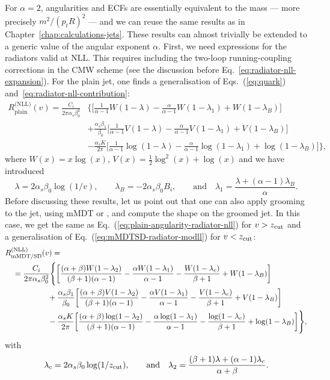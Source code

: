 For $\alpha=2$, angularities and ECFs are essentially equivalent to
the mass --- more precisely $m^2/(p_tR)^2$ --- and we can reuse the
same results as in Chapter~\ref{chap:calculations-jets}. 
%
These results can almost trivially be extended to a generic value of
the angular exponent $\alpha$. First, we need expressions for the
radiators valid at NLL. This requires including the two-loop
running-coupling corrections in the CMW scheme (see the discussion
before Eq.~\eqref{eq:radiator-nll-expansion}).
%
For the plain jet, one finds a generalisation of Eqs.~(\ref{eq:quark})
and~\eqref{eq:radiator-nll-contribution}:
\begin{align}\label{eq:plain-angularity-radiator-nll}
  R_\text{plain}^{\text{(NLL)}}(v)
   = \frac{C_i}{2\pi\alpha_s\beta_0^2}&\Bigg\{
    \bigg[\frac{1}{\alpha-1}W(1-\lambda)-\frac{\alpha}{\alpha-1}W(1-\lambda_1)+W(1-\lambda_B)\bigg]\\
  & +\frac{\alpha_s\beta_1}{\beta_0}\bigg[
\frac{1}{\alpha-1}V(1-\lambda)-\frac{\alpha}{\alpha-1}V(1-\lambda_1)+V(1-\lambda_B)
    \bigg]\nonumber\\
    & -\frac{\alpha_sK}{2\pi}\bigg[
\frac{1}{\alpha-1}\log(1-\lambda)-\frac{\alpha}{\alpha-1}\log(1-\lambda_1)+\log(1-\lambda_B)
    \bigg]\Bigg\},\nonumber
\end{align}
where $W(x)=x\log(x)$, $V(x)=\tfrac{1}{2}\log^2(x)+\log(x)$ and we have introduced 
\begin{equation}
  \lambda = 2\alpha_s\beta_0\log(1/v),\qquad
  \lambda_B = -2\alpha_s\beta_0 B_i,\qquad\text{and}\quad
  \lambda_1  = \frac{\lambda+(\alpha-1)\lambda_B}{\alpha}.
\end{equation}
Before discussing these results, let us point out that one can also
apply grooming to the jet, using mMDT or \SD, and compute the shape on
the groomed jet. In this case, we get the same as 
Eq.~(\ref{eq:plain-angularity-radiator-nll}) for $v>z_{\text{cut}}$ and a generalisation of
Eq.~(\ref{eq:mMDTSD-radiator-modll}) for $v< z_{\text{cut}}$:
\begin{align}\label{eq:sd-angularity-radiator-nll}
  \MoveEqLeft[1] R_\text{mMDT/SD}^{\text{(NLL)}}(v) = \\
  & = \frac{C_i}{2\pi\alpha_s\beta_0^2}\Bigg\{
    \bigg[\frac{(\alpha+\beta)W(1-\lambda_2)}{(\beta+1)(\alpha-1)}-\frac{\alpha
    W(1-\lambda_1)}{\alpha-1}-\frac{W(1-\lambda_c)}{\beta+1}+W(1-\lambda_B)\bigg]\nonumber\\
  & \phantom{=\frac{C_i}{2\pi\alpha_s\beta_0^2}}
    +\frac{\alpha_s\beta_1}{\beta_0}\bigg[
\frac{(\alpha+\beta)V(1-\lambda_2)}{(\beta+1)(\alpha-1)}-\frac{\alpha
    V(1-\lambda_1)}{\alpha-1}-\frac{V(1-\lambda_c)}{\beta+1}+V(1-\lambda_B)    \bigg]\nonumber\\
  & \phantom{=\frac{C_i}{2\pi\alpha_s\beta_0^2}}
    -\frac{\alpha_sK}{2\pi}\bigg[
\frac{(\alpha+\beta)\log(1-\lambda_2)}{(\beta+1)(\alpha-1)}-\frac{\alpha
    \log(1-\lambda_1)}{\alpha-1}-\frac{\log(1-\lambda_c)}{\beta+1}+\log(1-\lambda_B) \bigg]\Bigg\},\nonumber
\end{align}
with 
\begin{equation}
 \lambda_c = 2\alpha_s\beta_0\log(1/z_{\text{cut}}),
 \qquad\text{and}\quad
 \lambda_2 = \frac{(\beta+1)\lambda+(\alpha-1)\lambda_c}{\alpha+\beta}.
\end{equation}

